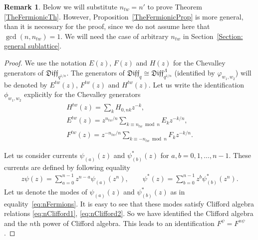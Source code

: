\documentclass[11pt]{article}
\numberwithin{equation}{section}
\theoremstyle{definition}
\newtheorem{Remark}[Theorem]{Remark}
\newcommand{\qD}{\mathfrak{Diff}_q}
\newcommand{\psia}{\psi_{({a})}}
\newcommand{\psib}{\psi^*_{( b )}}
\begin{document}
\begin{Remark}
Below we will substitute $n_{tw}=n'$ to prove Theorem \ref{TheFermionicTh}. However, Proposi\-tion~\ref{TheFermionicProp} is more general, than it is necessary for the proof, since we do not assume here that $\gcd(n, n_{tw})=1$. We will need the case of arbitrary $n_{tw}$ in Section~\ref{Section: general sublattice}.
\end{Remark}

\begin{proof}
We use the notation $E(z)$, $F(z)$ and $H(z)$ for the Chevalley generators of $\mathfrak{Diff}_{q^{1/n}}$. The generators of $\qD \cong \mathfrak{Diff}_{q^{1/n}}^{\Lambda}$ (identified by $\varphi_{w_1,w_2}$) will be denoted by $E^{tw}(z)$, $F^{tw}(z)$ and $H^{tw} (z)$. Let us write the identification $\phi_{w_1,w_2}$ explicitly for the Chevalley generators
\begin{gather}
H^{tw}(z) = \sum_k H_{ 0, nk} z^{-k}, \label{eq: tw chevalleyH}\\
E^{tw}(z) = z^{n_{tw}/n} \sum_{k \equiv n_{tw} \bmod n} E_{k} z^{-k/n}, \\
F^{tw}(z) = z^{-n_{tw}/n} \sum_{k \equiv -n_{tw} \bmod n} F_{ k} z^{-k/n} .\label{eq: tw chevalleyF}
\end{gather}

Let us consider currents $\psia (z)$ and $\psib (z)$ for $a,b = 0, 1, \dots, n-1$. These currents are defined by following equality
\begin{gather}
z \psi(z) = \sum_{a=0}^{n-1} z^{n-a} \psia (z^n) , \qquad
\psi^*(z) = \sum_{b=0}^{n-1} z^{b} \psib (z^n).\label{defa1}
\end{gather}
Let us denote the modes of $\psia (z)$ and $\psib (z)$ as in equality~\eqref{eq:nFermions}. It is easy to see that these modes satisfy Clifford algebra relations \eqref{eq:nClifford1}, \eqref{eq:nClifford2}. So we have identified the Clifford algebra and the $n$th power of Clifford algebra. This leads to an identification $F^{\psi}=F^{n \psi}$.


\end{proof}
\end{document}
